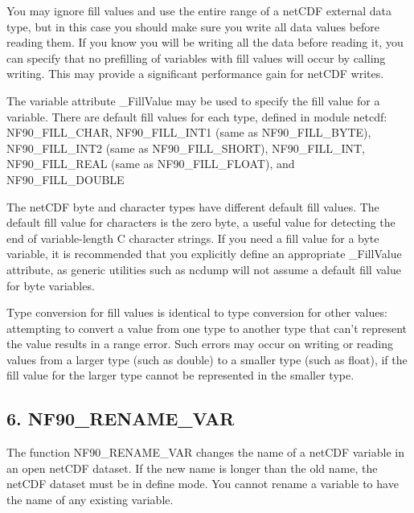 You may ignore fill values and use the entire range of a net\+C\+DF external data type, but in this case you should make sure you write all data values before reading them. If you know you will be writing all the data before reading it, you can specify that no prefilling of variables with fill values will occur by calling writing. This may provide a significant performance gain for net\+C\+DF writes.

The variable attribute \+\_\+\+Fill\+Value may be used to specify the fill value for a variable. There are default fill values for each type, defined in module netcdf\+: N\+F90\+\_\+\+F\+I\+L\+L\+\_\+\+C\+H\+AR, N\+F90\+\_\+\+F\+I\+L\+L\+\_\+\+I\+N\+T1 (same as N\+F90\+\_\+\+F\+I\+L\+L\+\_\+\+B\+Y\+TE), N\+F90\+\_\+\+F\+I\+L\+L\+\_\+\+I\+N\+T2 (same as N\+F90\+\_\+\+F\+I\+L\+L\+\_\+\+S\+H\+O\+RT), N\+F90\+\_\+\+F\+I\+L\+L\+\_\+\+I\+NT, N\+F90\+\_\+\+F\+I\+L\+L\+\_\+\+R\+E\+AL (same as N\+F90\+\_\+\+F\+I\+L\+L\+\_\+\+F\+L\+O\+AT), and N\+F90\+\_\+\+F\+I\+L\+L\+\_\+\+D\+O\+U\+B\+LE

The net\+C\+DF byte and character types have different default fill values. The default fill value for characters is the zero byte, a useful value for detecting the end of variable-\/length C character strings. If you need a fill value for a byte variable, it is recommended that you explicitly define an appropriate \+\_\+\+Fill\+Value attribute, as generic utilities such as ncdump will not assume a default fill value for byte variables.

Type conversion for fill values is identical to type conversion for other values\+: attempting to convert a value from one type to another type that can’t represent the value results in a range error. Such errors may occur on writing or reading values from a larger type (such as double) to a smaller type (such as float), if the fill value for the larger type cannot be represented in the smaller type.\hypertarget{f90-variables_f90-nf90_rename_var}{}\subsection{6. N\+F90\+\_\+\+R\+E\+N\+A\+M\+E\+\_\+\+V\+A\+R }\label{f90-variables_f90-nf90_rename_var}
The function N\+F90\+\_\+\+R\+E\+N\+A\+M\+E\+\_\+\+V\+AR changes the name of a net\+C\+DF variable in an open net\+C\+DF dataset. If the new name is longer than the old name, the net\+C\+DF dataset must be in define mode. You cannot rename a variable to have the name of any existing variable.

